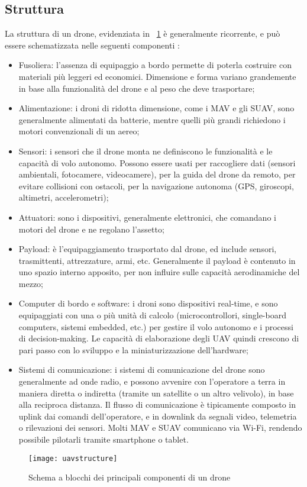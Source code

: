 \subsection[Struttura]{Struttura}
La struttura di un drone, evidenziata in \figurename\ \ref{fig:uavstructure} è generalmente ricorrente, e può essere schematizzata nelle seguenti componenti \cite{Sahingoz2014}:

\begin{itemize}
	\item Fusoliera: l'assenza di equipaggio a bordo permette di poterla costruire con materiali più leggeri ed economici. Dimensione e forma variano grandemente in base alla funzionalità del drone e al peso che deve trasportare;
	\item Alimentazione: i droni di ridotta dimensione, come i MAV e gli SUAV, sono generalmente alimentati da batterie, mentre quelli più grandi richiedono i motori convenzionali di un aereo;
	\item Sensori: i sensori che il drone monta ne definiscono le funzionalità e le capacità di volo autonomo. Possono essere usati per raccogliere dati (sensori ambientali, fotocamere, videocamere), per la guida del drone da remoto, per evitare collisioni con ostacoli, per la navigazione autonoma (GPS, giroscopi, altimetri, accelerometri);
	\item Attuatori: sono i dispositivi, generalmente elettronici, che comandano i motori del drone e ne regolano l'assetto;
	\item Payload: è l'equipaggiamento trasportato dal drone, ed include sensori, trasmittenti, attrezzature, armi, etc. Generalmente il payload è contenuto in uno spazio interno apposito, per non influire sulle capacità aerodinamiche del mezzo;
	\item Computer di bordo e software: i droni sono dispositivi real-time, e sono equipaggiati con una o più unità di calcolo (microcontrollori, single-board computers, sistemi embedded, etc.)  per gestire il volo autonomo e i processi di decision-making. Le capacità di elaborazione degli UAV quindi crescono di pari passo con lo sviluppo e la miniaturizzazione dell'hardware;
	\item Sistemi di comunicazione: i sistemi di comunicazione del drone sono generalmente ad onde radio, e possono avvenire con l'operatore a terra in maniera diretta o indiretta (tramite un satellite o un altro velivolo), in base alla reciproca distanza. Il flusso di comunicazione è tipicamente composto in uplink dai comandi dell'operatore, e in downlink da segnali video, telemetria o rilevazioni dei sensori. Molti  MAV e SUAV comunicano via Wi-Fi, rendendo possibile pilotarli tramite smartphone o tablet.  
\end{itemize}
%
\begin{figure}
	\begin{center}
		\texttt{[image: uavstructure]}
	\end{center}
	\caption{Schema a blocchi dei principali componenti di un drone} \label{fig:uavstructure}
\end{figure}
%
